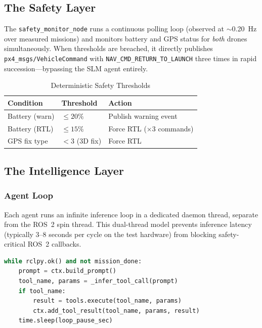 \documentclass[conference]{IEEEtran}
\begin{document}
\subsection{The Safety Layer}

The \texttt{safety\_monitor\_node} runs a continuous polling loop (observed at $\sim$0.20~Hz over measured missions) and monitors battery and GPS status for \emph{both} drones simultaneously. When thresholds are breached, it directly publishes \texttt{px4\_msgs/VehicleCommand} with \texttt{NAV\_CMD\_RETURN\_TO\_LAUNCH} three times in rapid succession—bypassing the SLM agent entirely.

\begin{table}[htbp]
\caption{Deterministic Safety Thresholds}
\label{tab:safety}
\centering
\begin{tabular}{@{}lp{1.8cm}p{2.8cm}@{}}
\toprule
\textbf{Condition} & \textbf{Threshold} & \textbf{Action} \\
\midrule
Battery (warn) & $\leq 20\%$ & Publish warning event \\
Battery (RTL) & $\leq 15\%$ & Force RTL (×3 commands) \\
GPS fix type & $< 3$ (3D fix) & Force RTL \\
\bottomrule
\end{tabular}
\end{table}

\subsection{The Intelligence Layer}

\subsubsection{Agent Loop}

Each agent runs an infinite inference loop in a dedicated daemon thread, separate from the ROS~2 spin thread. This dual-thread model prevents inference latency (typically 3–8 seconds per cycle on the test hardware) from blocking safety-critical ROS~2 callbacks.

\begin{lstlisting}[language=Python, caption={Simplified agent loop structure.}]
while rclpy.ok() and not mission_done:
    prompt = ctx.build_prompt()
    tool_name, params = _infer_tool_call(prompt)
    if tool_name:
        result = tools.execute(tool_name, params)
        ctx.add_tool_result(tool_name, params, result)
    time.sleep(loop_pause_sec)
\end{lstlisting}
\end{document}
